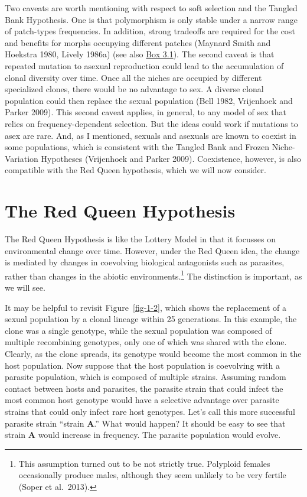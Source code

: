 \documentclass[
  letterpaper,
]{book}
\begin{document}
Two caveats are worth mentioning with respect to soft selection and the
Tangled Bank Hypothesis. One is that polymorphism is only stable under a
narrow range of patch-types frequencies. In addition, strong tradeoffs
are required for the cost and benefits for morphs occupying different
patches (Maynard Smith and Hoekstra 1980, Lively 1986a) (see also
\href{https://iulibscholcomm.github.io/through-the-looking-glass/eco-hyp-cont.html\#callout-4}{Box
3.1}). The second caveat is that repeated mutation to asexual
reproduction could lead to the accumulation of clonal diversity over
time. Once all the niches are occupied by different specialized clones,
there would be no advantage to sex. A diverse clonal population could
then replace the sexual population (Bell 1982, Vrijenhoek and Parker
2009). This second caveat applies, in general, to any model of sex that
relies on frequency-dependent selection. But the ideas could work if
mutations to asex are rare. And, as I mentioned, sexuals and asexuals
are known to coexist in some populations, which is consistent with the
Tangled Bank and Frozen Niche-Variation Hypotheses (Vrijenhoek and
Parker 2009). Coexistence, however, is also compatible with the Red
Queen hypothesis, which we will now consider.

\hypertarget{the-red-queen-hypothesis}{%
\section{The Red Queen Hypothesis}\label{the-red-queen-hypothesis}}

The Red Queen Hypothesis is like the Lottery Model in that it focusses
on environmental change over time. However, under the Red Queen idea,
the change is mediated by changes in coevolving biological antagonists
such as parasites, rather than changes in the abiotic
environments.\footnote{This assumption turned out to be not strictly
  true. Polyploid females occasionally produce males, although they seem
  unlikely to be very fertile (Soper et al.~2013).} The distinction is
important, as we will see.

It may be helpful to revisit Figure~\ref{fig-1-2}, which shows the
replacement of a sexual population by a clonal lineage within 25
generations. In this example, the clone was a single genotype, while the
sexual population was composed of multiple recombining genotypes, only
one of which was shared with the clone. Clearly, as the clone spreads,
its genotype would become the most common in the host population. Now
suppose that the host population is coevolving with a parasite
population, which is composed of multiple strains. Assuming random
contact between hosts and parasites, the parasite strain that could
infect the most common host genotype would have a selective advantage
over parasite strains that could only infect rare host genotypes. Let's
call this more successful parasite strain ``strain \textbf{A}.'' What
would happen? It should be easy to see that strain \textbf{A} would
increase in frequency. The parasite population would evolve.
\end{document}
